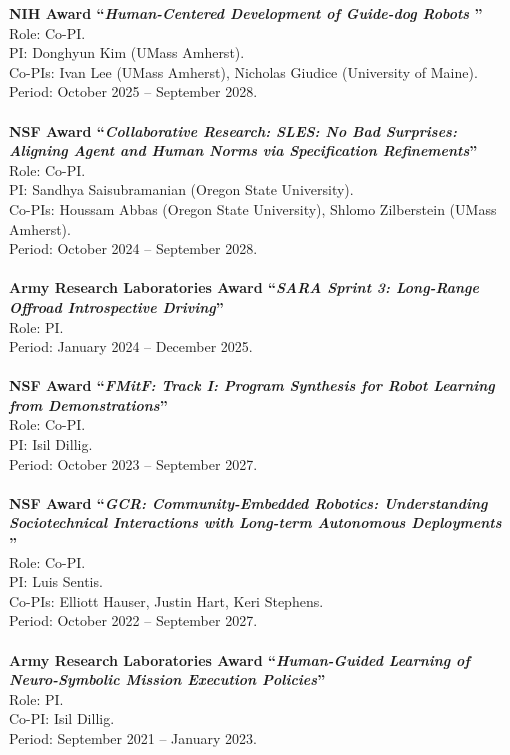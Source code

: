 \documentclass[Times]{article}
\newcommand{\funding}[1]{#1\\}
\renewcommand{\funding}[1]{\\}
\begin{document}
\textbf{NIH Award ``\emph{Human-Centered Development of Guide-dog Robots
}''}\\
Role: Co-PI.\\
PI: Donghyun Kim (UMass Amherst).\\
Co-PIs: Ivan Lee (UMass Amherst), Nicholas Giudice (University of Maine).\\
Period: October 2025 -- September 2028.\\
\funding{Amount: \$1,000,000}

\textbf{NSF Award ``\emph{Collaborative Research: SLES: No Bad Surprises: Aligning Agent and Human Norms via Specification Refinements}''}\\
Role: Co-PI.\\
PI: Sandhya Saisubramanian (Oregon State University).\\
Co-PIs: Houssam Abbas (Oregon State University), Shlomo Zilberstein (UMass Amherst).\\
Period: October 2024 -- September 2028.\\
\funding{Amount: \$375,000}

\textbf{Army Research Laboratories Award ``\emph{SARA Sprint 3: Long-Range Offroad Introspective Driving}''}\\
Role: PI.\\
Period: January 2024 -- December 2025.\\
\funding{Amount: \$1,398,473}

\textbf{NSF Award ``\emph{FMitF: Track I: Program Synthesis for Robot
Learning from Demonstrations}''}\\
Role: Co-PI.\\
PI: Isil Dillig.\\
Period: October 2023 -- September 2027.\\
\funding{Amount: \$750,000}

\textbf{NSF Award ``\emph{GCR: Community-Embedded Robotics: Understanding Sociotechnical Interactions with Long-term Autonomous Deployments
}''}\\
Role: Co-PI.\\
PI: Luis Sentis.\\
Co-PIs: Elliott Hauser, Justin Hart, Keri Stephens.\\
Period: October 2022 -- September 2027.\\
\funding{Amount: \$3,600,000}

\textbf{Army Research Laboratories Award ``\emph{Human-Guided Learning of Neuro-Symbolic Mission Execution Policies}''}\\
Role: PI.\\
Co-PI: Isil Dillig.\\
Period: September 2021 -- January 2023.\\
\funding{Amount: \$372,798}
\end{document}
